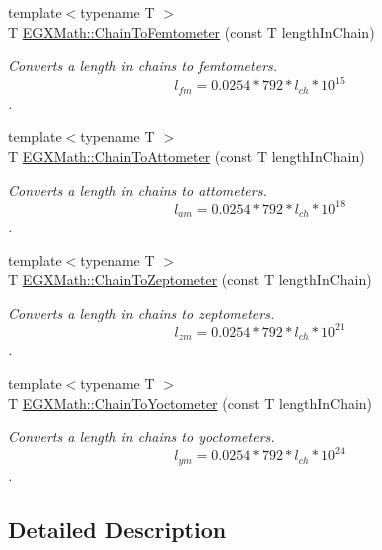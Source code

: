 \begin{DoxyCompactItemize}
{\footnotesize template$<$typename T $>$ }\\T \mbox{\hyperlink{group___e_g_x_math-_conversions-_length_conversions-_imperial-_chain-_s_i_ga21bde6f9a920aced344185d4ed645183}{E\+G\+X\+Math\+::\+Chain\+To\+Femtometer}} (const T length\+In\+Chain)
\begin{DoxyCompactList}\small\item\em Converts a length in chains to femtometers. \[ l_{fm}=0.0254 * 792 * l_{ch} * 10^{15} \]. \end{DoxyCompactList}\item 
{\footnotesize template$<$typename T $>$ }\\T \mbox{\hyperlink{group___e_g_x_math-_conversions-_length_conversions-_imperial-_chain-_s_i_ga1e983c3063080200438c09bdafa20e02}{E\+G\+X\+Math\+::\+Chain\+To\+Attometer}} (const T length\+In\+Chain)
\begin{DoxyCompactList}\small\item\em Converts a length in chains to attometers. \[ l_{am}=0.0254 * 792 * l_{ch} * 10^{18} \]. \end{DoxyCompactList}\item 
{\footnotesize template$<$typename T $>$ }\\T \mbox{\hyperlink{group___e_g_x_math-_conversions-_length_conversions-_imperial-_chain-_s_i_ga5c9f25b27d059b6b458111270a20209a}{E\+G\+X\+Math\+::\+Chain\+To\+Zeptometer}} (const T length\+In\+Chain)
\begin{DoxyCompactList}\small\item\em Converts a length in chains to zeptometers. \[ l_{zm}=0.0254 * 792 * l_{ch} * 10^{21} \]. \end{DoxyCompactList}\item 
{\footnotesize template$<$typename T $>$ }\\T \mbox{\hyperlink{group___e_g_x_math-_conversions-_length_conversions-_imperial-_chain-_s_i_gafcc220586dd2018bb921f109efa11d06}{E\+G\+X\+Math\+::\+Chain\+To\+Yoctometer}} (const T length\+In\+Chain)
\begin{DoxyCompactList}\small\item\em Converts a length in chains to yoctometers. \[ l_{ym}=0.0254 * 792 * l_{ch} * 10^{24} \]. \end{DoxyCompactList}\end{DoxyCompactItemize}


\subsection{Detailed Description}


